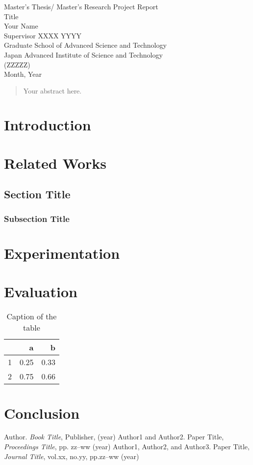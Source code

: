 \documentclass[12pt,a4paper]{report}
\begin{document}
\thispagestyle{empty}
\begin{center}
Master's Thesis/ Master's Research Project Report\\%
\vfill
Title\\
\vfill
Your Name\\
\vfill
Supervisor  XXXX YYYY\\
\vfill
Graduate School of Advanced Science and Technology\\ %
Japan Advanced Institute of Science and Technology\\
(ZZZZZ)\\ %
\vfill
Month, Year\\ %
\vfill
\end{center}
\clearpage
\begin{abstract}
Your abstract here.
\end{abstract}
\tableofcontents\thispagestyle{empty}
\listoffigures\thispagestyle{empty}
\listoftables\thispagestyle{empty}

\setcounter{page}{0}
\chapter{Introduction}
\chapter{Related Works}
\section{Section Title}
\subsection{Subsection Title}


\chapter{Experimentation}
\chapter{Evaluation}
\begin{table}
\centering
\begin{tabular}{r|rr}
& a & b\\ \hline
1& 0.25 & 0.33\\
2& 0.75 & 0.66\\
\end{tabular}
\caption{Caption of the table}\label{table1}
\end{table}
\chapter{Conclusion}
%

\begin{thebibliography}{99}
 Author. \textit{Book Title}, Publisher, (year)
 Author1 and Author2. Paper Title, \textit{Proceedings Title}, pp. zz--ww (year)
 Author1, Author2, and Author3. Paper Title, \textit{Journal Title}, vol.xx, no.yy, pp.zz--ww (year)
\end{thebibliography}
\end{document}
